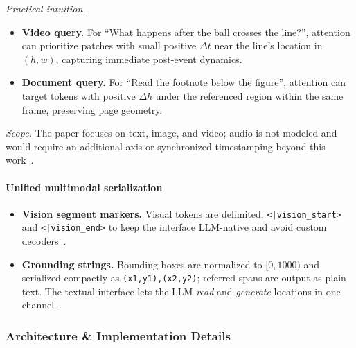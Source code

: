 \begin{enrichment}
\begin{enrichment}
        \textit{Practical intuition.}
        \begin{itemize}
            \item \textbf{Video query.} For “What happens after the ball crosses the line?”, attention can prioritize patches with small positive $\Delta t$ near the line’s location in $(h,w)$, capturing immediate post\mbox{-}event dynamics. 
            \item \textbf{Document query.} For “Read the footnote below the figure”, attention can target tokens with positive $\Delta h$ under the referenced region within the same frame, preserving page geometry. 
        \end{itemize}
        \textit{Scope.} The paper focuses on text, image, and video; audio is not modeled and would require an additional axis or synchronized timestamping beyond this work~\cite{wang2024_qwen2vl}.
        
        \paragraph{Unified multimodal serialization}
        \begin{itemize}
            \item \textbf{Vision segment markers.} Visual tokens are delimited: \verb|<|{\footnotesize\texttt{|}}\verb|vision_start|\verb|>| and \verb|<|{\footnotesize\texttt{|}}\verb|vision_end|\verb|>| to keep the interface LLM-native and avoid custom decoders~\cite{wang2024_qwen2vl}.
            \item \textbf{Grounding strings.} Bounding boxes are normalized to $[0,1000)$ and serialized compactly as \verb|(x1,y1),(x2,y2)|; referred spans are output as plain text. The textual interface lets the LLM \emph{read} and \emph{generate} locations in one channel~\cite{wang2024_qwen2vl}.
        \end{itemize}
        
        \subsubsection{Architecture \& Implementation Details}
        \label{subsubsec:chapter24_qwen2vl_arch}
        

\end{enrichment}
\end{enrichment}
